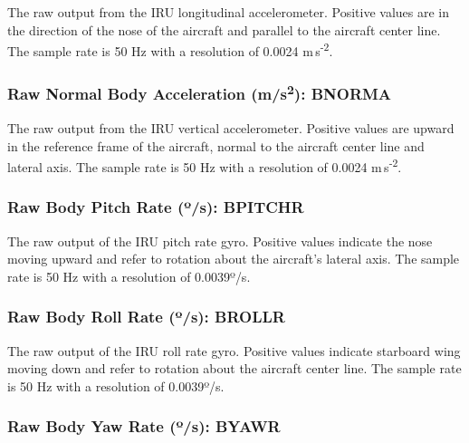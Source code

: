 \documentclass[
  english,
]{book}
\begin{document}
The raw output from the IRU longitudinal accelerometer. Positive values
are in the direction of the nose of the aircraft and parallel to the
aircraft center line. The sample rate is 50 Hz with a resolution of
0.0024 m s\textsuperscript{-2}.

\hypertarget{bnorma}{%
\subsubsection*{\texorpdfstring{Raw Normal Body Acceleration
(m/s\textsuperscript{2}):
BNORMA}{Raw Normal Body Acceleration (m/s2): BNORMA}}\label{bnorma}}

The raw output from the IRU vertical accelerometer. Positive values are
upward in the reference frame of the aircraft, normal to the aircraft
center line and lateral axis. The sample rate is 50 Hz with a resolution
of 0.0024 m s\textsuperscript{-2}.

\hypertarget{bpitchr}{%
\subsubsection*{\texorpdfstring{Raw Body Pitch Rate ({º}/s):
BPITCHR}{Raw Body Pitch Rate (º/s): BPITCHR}}\label{bpitchr}}

The raw output of the IRU pitch rate gyro. Positive values indicate the
nose moving upward and refer to rotation about the aircraft's lateral
axis. The sample rate is 50 Hz with a resolution of 0.0039{º}/s.

\hypertarget{brollr}{%
\subsubsection*{\texorpdfstring{Raw Body Roll Rate ({º}/s):
BROLLR}{Raw Body Roll Rate (º/s): BROLLR}}\label{brollr}}

The raw output of the IRU roll rate gyro. Positive values indicate
starboard wing moving down and refer to rotation about the aircraft
center line. The sample rate is 50 Hz with a resolution of 0.0039{º}/s.

\hypertarget{byawr}{%
\subsubsection*{\texorpdfstring{Raw Body Yaw Rate ({º}/s):
BYAWR}{Raw Body Yaw Rate (º/s): BYAWR}}\label{byawr}}
\end{document}

